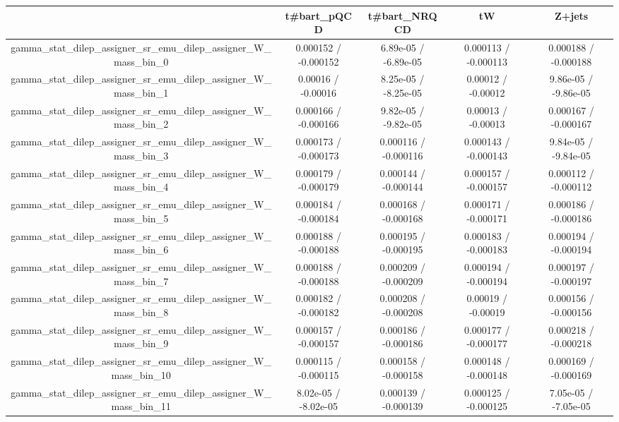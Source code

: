 \documentclass[10pt]{article}
\begin{document}
\begin{table}[htbp]
\begin{center}
\begin{tabular}{|c|c|c|c|c|}
\hline 
      & t#bar{t}_{pQCD}      & t#bar{t}_{NRQCD}      & tW      & Z+jets \\ 
\hline 
  gamma_stat_dilep_assigner_sr_emu_dilep_assigner_W_mass_bin_0 & 0.000152 / -0.000152 & 6.89e-05 / -6.89e-05 & 0.000113 / -0.000113 & 0.000188 / -0.000188 \\ 
  gamma_stat_dilep_assigner_sr_emu_dilep_assigner_W_mass_bin_1 & 0.00016 / -0.00016 & 8.25e-05 / -8.25e-05 & 0.00012 / -0.00012 & 9.86e-05 / -9.86e-05 \\ 
  gamma_stat_dilep_assigner_sr_emu_dilep_assigner_W_mass_bin_2 & 0.000166 / -0.000166 & 9.82e-05 / -9.82e-05 & 0.00013 / -0.00013 & 0.000167 / -0.000167 \\ 
  gamma_stat_dilep_assigner_sr_emu_dilep_assigner_W_mass_bin_3 & 0.000173 / -0.000173 & 0.000116 / -0.000116 & 0.000143 / -0.000143 & 9.84e-05 / -9.84e-05 \\ 
  gamma_stat_dilep_assigner_sr_emu_dilep_assigner_W_mass_bin_4 & 0.000179 / -0.000179 & 0.000144 / -0.000144 & 0.000157 / -0.000157 & 0.000112 / -0.000112 \\ 
  gamma_stat_dilep_assigner_sr_emu_dilep_assigner_W_mass_bin_5 & 0.000184 / -0.000184 & 0.000168 / -0.000168 & 0.000171 / -0.000171 & 0.000186 / -0.000186 \\ 
  gamma_stat_dilep_assigner_sr_emu_dilep_assigner_W_mass_bin_6 & 0.000188 / -0.000188 & 0.000195 / -0.000195 & 0.000183 / -0.000183 & 0.000194 / -0.000194 \\ 
  gamma_stat_dilep_assigner_sr_emu_dilep_assigner_W_mass_bin_7 & 0.000188 / -0.000188 & 0.000209 / -0.000209 & 0.000194 / -0.000194 & 0.000197 / -0.000197 \\ 
  gamma_stat_dilep_assigner_sr_emu_dilep_assigner_W_mass_bin_8 & 0.000182 / -0.000182 & 0.000208 / -0.000208 & 0.00019 / -0.00019 & 0.000156 / -0.000156 \\ 
  gamma_stat_dilep_assigner_sr_emu_dilep_assigner_W_mass_bin_9 & 0.000157 / -0.000157 & 0.000186 / -0.000186 & 0.000177 / -0.000177 & 0.000218 / -0.000218 \\ 
  gamma_stat_dilep_assigner_sr_emu_dilep_assigner_W_mass_bin_10 & 0.000115 / -0.000115 & 0.000158 / -0.000158 & 0.000148 / -0.000148 & 0.000169 / -0.000169 \\ 
  gamma_stat_dilep_assigner_sr_emu_dilep_assigner_W_mass_bin_11 & 8.02e-05 / -8.02e-05 & 0.000139 / -0.000139 & 0.000125 / -0.000125 & 7.05e-05 / -7.05e-05 \\ 

\end{tabular}
\end{center}
\end{table}
\end{document}
